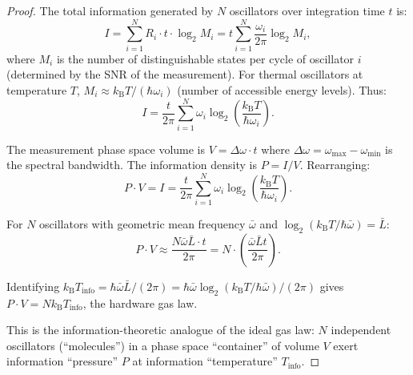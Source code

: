 \documentclass[11pt,a4paper]{article}
\theoremstyle{definition}
\theoremstyle{remark}
\newcommand{\kB}{k_{\mathrm{B}}}
\begin{document}
\begin{proof}
The total information generated by $N$ oscillators over integration time $t$ is:
\begin{equation}
I = \sum_{i=1}^N R_i \cdot t \cdot \log_2 M_i = t \sum_{i=1}^N \frac{\omega_i}{2\pi} \log_2 M_i,
\end{equation}
where $M_i$ is the number of distinguishable states per cycle of oscillator $i$ (determined by the SNR of the measurement). For thermal oscillators at temperature $T$, $M_i \approx \kB T / (\hbar\omega_i)$ (number of accessible energy levels). Thus:
\begin{equation}
I = \frac{t}{2\pi} \sum_{i=1}^N \omega_i \log_2\left(\frac{\kB T}{\hbar\omega_i}\right).
\end{equation}

The measurement phase space volume is $V = \Delta\omega \cdot t$ where $\Delta\omega = \omega_{\max} - \omega_{\min}$ is the spectral bandwidth. The information density is $P = I/V$. Rearranging:
\begin{equation}
P \cdot V = I = \frac{t}{2\pi} \sum_{i=1}^N \omega_i \log_2\left(\frac{\kB T}{\hbar\omega_i}\right).
\end{equation}

For $N$ oscillators with geometric mean frequency $\bar{\omega}$ and $\log_2(\kB T/\hbar\bar{\omega}) = \bar{L}$:
\begin{equation}
P \cdot V \approx \frac{N \bar{\omega} \bar{L} \cdot t}{2\pi} = N \cdot \left(\frac{\bar{\omega} \bar{L} t}{2\pi}\right).
\end{equation}

Identifying $\kB T_{\mathrm{info}} = \hbar\bar{\omega}\bar{L}/(2\pi) = \hbar\bar{\omega}\log_2(\kB T/\hbar\bar{\omega})/(2\pi)$ gives $P \cdot V = N \kB T_{\mathrm{info}}$, the hardware gas law.

This is the information-theoretic analogue of the ideal gas law: $N$ independent oscillators (``molecules'') in a phase space ``container'' of volume $V$ exert information ``pressure'' $P$ at information ``temperature'' $T_{\mathrm{info}}$.
\end{proof}
\end{document}
